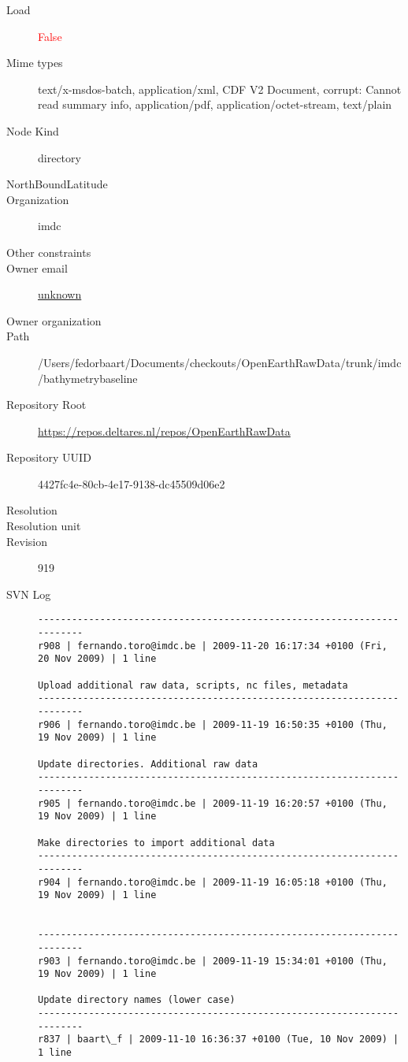 \documentclass[9]{report}
\begin{document}
\begin{description}
  \item[Load] \textcolor{red}{False}
  \item[Mime types] text/x-msdos-batch, application/xml, CDF V2 Document, corrupt: Cannot read summary info, application/pdf, application/octet-stream, text/plain
  \item[Node Kind] directory
  \item[NorthBoundLatitude] 
  \item[Organization] imdc
  \item[Other constraints] 
  \item[Owner email] \href{mailto:unknown}{unknown}
  \item[Owner organization] 
  \item[Path] /Users/fedorbaart/Documents/checkouts/OpenEarthRawData/trunk/imdc/bathymetrybaseline
  \item[Repository Root] \href{https://repos.deltares.nl/repos/OpenEarthRawData}{https://repos.deltares.nl/repos/OpenEarthRawData}
  \item[Repository UUID] 4427fc4e-80cb-4e17-9138-dc45509d06e2
  \item[Resolution] 
  \item[Resolution unit] 
  \item[Revision] 919
  \item[SVN Log] \begin{verbatim}
------------------------------------------------------------------------
r908 | fernando.toro@imdc.be | 2009-11-20 16:17:34 +0100 (Fri, 20 Nov 2009) | 1 line

Upload additional raw data, scripts, nc files, metadata
------------------------------------------------------------------------
r906 | fernando.toro@imdc.be | 2009-11-19 16:50:35 +0100 (Thu, 19 Nov 2009) | 1 line

Update directories. Additional raw data
------------------------------------------------------------------------
r905 | fernando.toro@imdc.be | 2009-11-19 16:20:57 +0100 (Thu, 19 Nov 2009) | 1 line

Make directories to import additional data
------------------------------------------------------------------------
r904 | fernando.toro@imdc.be | 2009-11-19 16:05:18 +0100 (Thu, 19 Nov 2009) | 1 line


------------------------------------------------------------------------
r903 | fernando.toro@imdc.be | 2009-11-19 15:34:01 +0100 (Thu, 19 Nov 2009) | 1 line

Update directory names (lower case)
------------------------------------------------------------------------
r837 | baart\_f | 2009-11-10 16:36:37 +0100 (Tue, 10 Nov 2009) | 1 line


\end{verbatim}
\end{description}
\end{document}
